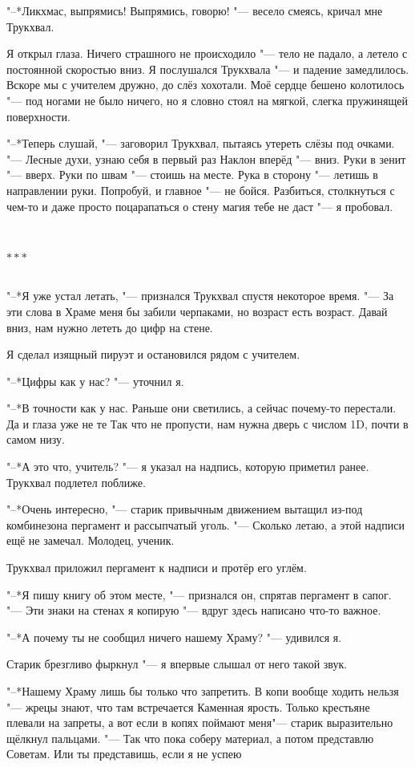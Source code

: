 \documentclass[a4paper,10pt]{book}
\newcommand{\ldotst}{\so{...}\xspace}
\newcommand{\razd}{~\\{\centering\Large\bfseries$\ast \ast \ast$\par}~\\}
\begin{document}
"--*Ликхмас, выпрямись! Выпрямись, говорю! "--- весело смеясь, кричал мне 
Трукхвал.

Я открыл глаза. Ничего страшного не происходило "--- тело не падало, а летело с 
постоянной скоростью вниз. Я послушался Трукхвала "--- и падение замедлилось. 
Вскоре мы с учителем дружно, до слёз хохотали. Моё сердце бешено колотилось 
"--- под ногами не было ничего, но я словно стоял на мягкой, слегка пружинящей 
поверхности.

"--*Теперь слушай, "--- заговорил Трукхвал, пытаясь утереть слёзы под очками. 
"--- Лесные духи, узнаю себя в первый раз\ldotst Наклон вперёд "--- вниз. Руки 
в зенит "--- вверх. Руки по швам "--- стоишь на месте. Рука в сторону "--- 
летишь в направлении руки. Попробуй, и главное "--- не бойся. Разбиться, 
столкнуться с чем-то и даже просто поцарапаться о стену магия тебе не даст "--- 
я пробовал.

\razd

"--*Я уже устал летать, "--- признался Трукхвал спустя некоторое время. "--- За 
эти слова в Храме меня бы забили черпаками, но возраст есть возраст. Давай 
вниз, нам нужно лететь до цифр на стене.

Я сделал изящный пируэт и остановился рядом с учителем.

"--*Цифры как у нас? "--- уточнил я.

"--*В точности как у нас. Раньше они светились, а сейчас почему-то перестали. 
Да и глаза уже не те\ldotst Так что не пропусти, нам нужна дверь с числом 1D, 
почти в самом низу.

"--*А это что, учитель? "--- я указал на надпись, которую приметил ранее. 
Трукхвал подлетел поближе.

"--*Очень интересно, "--- старик привычным движением вытащил из-под комбинезона 
пергамент и рассыпчатый уголь. "--- Сколько летаю, а этой надписи ещё не 
замечал. Молодец, ученик.

Трукхвал приложил пергамент к надписи и протёр его углём.

"--*Я\ldotst пишу книгу об этом месте, "--- признался он, спрятав пергамент в 
сапог. "--- Эти знаки на стенах я копирую "--- вдруг здесь написано что-то 
важное.

"--*А почему ты не сообщил ничего нашему Храму? "--- удивился я.

Старик брезгливо фыркнул "--- я впервые слышал от него такой звук.

"--*Нашему Храму лишь бы только что запретить. В копи вообще ходить нельзя "--- 
жрецы знают, что там встречается Каменная ярость. Только крестьяне плевали на 
запреты, а вот если в копях поймают меня\ldotst "--- старик выразительно 
щёлкнул пальцами. "--- Так что пока соберу материал, а потом представлю 
Советам. Или ты представишь, если я не успею\ldotst
\end{document}
